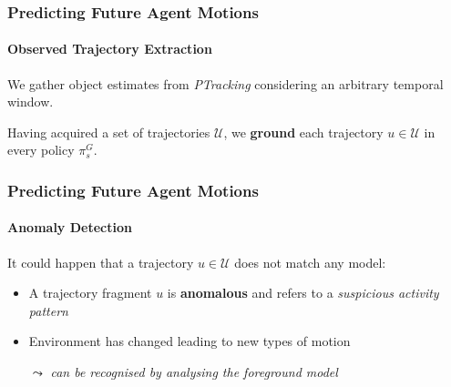 \begin{frame}
	\frametitle{Predicting Future Agent Motions}
	\framesubtitle{Observed Trajectory Extraction}
	
	\LARGE
	
	\vspace{0.4cm}
	
	We gather object estimates from \emph{PTracking} considering an arbitrary temporal window. \\
	
	\vspace{0.4cm}
	
	Having acquired a set of trajectories $ \mathcal{U} $, we \textbf{ground} each trajectory $ u \in
	\mathcal{U} $ in every policy $ \pi_s^G $. \\
\end{frame}

\begin{frame}
	\frametitle{Predicting Future Agent Motions}
	\framesubtitle{Anomaly Detection}
	
	\LARGE
	
	\vspace{0.5cm}
	
	It could happen that a trajectory $ u \in \mathcal{U} $ does not match any model:
	\begin{itemize}
		\item A trajectory fragment $ u $ is \textbf{anomalous} and refers to a \emph{suspicious
			  activity pattern}
		\item Environment has changed leading to new types of motion
			  \vspace{-0.25cm}
			  \begin{tabbing}
				  \hspace{0.3cm}
				  \large
				  $ \leadsto $ \emph{can be recognised by analysing the foreground model}
			  \end{tabbing}
	\end{itemize}
\end{frame}

